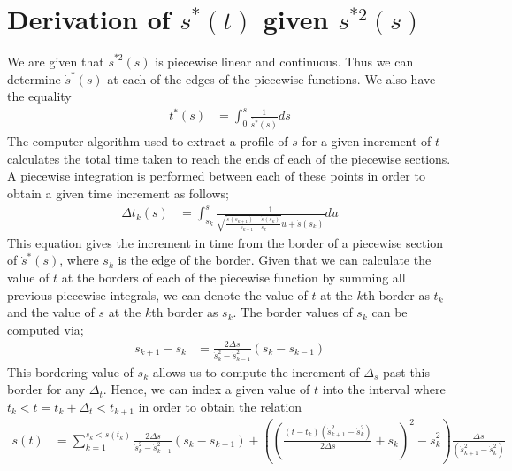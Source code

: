 \chapter{Derivation of $s^*(t)$ given $s^{*2}(s)$}
We are given that $\dot{s}^{*2}(s)$ is piecewise linear and continuous. Thus we can determine $\dot{s}^*(s)$ at each of the edges of the piecewise functions. We also have the equality
\begin{align*}
t^*(s) &= \int^s_0\frac{1}{\dot{s^*}(s)}ds
\end{align*} 
The computer algorithm used to extract a profile of $s$ for a given increment of $t$ calculates the total time taken to reach the ends of each of the piecewise sections. A piecewise integration is performed between each of these points in order to obtain a given time increment as follows;
\begin{align*}
\Delta t_k(s) &= \int_{s_k}^s \frac{1}{\sqrt{\frac{\dot{s}(s_{k+1}) - \dot{s}(s_{k})}{s_{k+1} - s_{k}}} u + \dot{s}(s_{k})} du
\end{align*}
This equation gives the increment in time from the border of a piecewise section of $\dot{s}^*(s)$, where $s_k$ is the edge of the border.
Given that we can calculate the value of $t$ at the borders of each of the piecewise function by summing all previous piecewise integrals, we can denote the value of $t$ at the $k$th border as $t_k$ and the value of $s$ at the $k$th border as $s_k$. The border values of $s_k$ can be computed via;
\begin{align*}
s_{k+1} - s_k &= \frac{2\Delta s}{\dot{s}^2_k - \dot{s}^2_{k-1}} \left(\dot{s}_k -\dot{s}_{k-1}\right)
\end{align*}
This bordering value of $s_k$ allows us to compute the increment of $\Delta_s$ past this border for any $\Delta_t$. Hence, we can index a given value of $t$ into the interval where $t_k < t = t_k + \Delta_t < t_{k+1}$ in order to obtain the relation
\begin{align*}
s(t) &= \sum_{k=1}^{s_k < s(t_k)} \frac{2\Delta s}{\dot{s}^2_k - \dot{s}^2_{k-1}} \left(\dot{s}_k -\dot{s}_{k-1}\right) + \left(\left(\frac{(t-t_{k})(\dot{s}^2_{k+1} - \dot{s}^2_{k})}{2 \Delta s} + \dot{s}_k\right)^2 - \dot{s}^2_k \right)\frac{\Delta s}{(\dot{s}^2_{k+1} - \dot{s}^2_{k})}\\	
\end{align*}